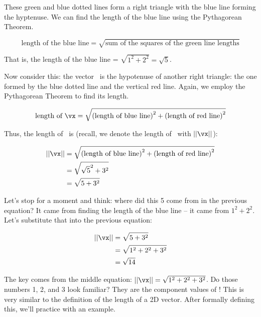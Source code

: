 These green and blue dotted lines form a right triangle with the blue line forming the hyptenuse. We can find the length of the blue line using the Pythagorean Theorem. 

$$\text{length of the blue line} = \sqrt{ \text{sum of the squares of the green line lengths}}$$

That is, the length of the blue line = $\sqrt{1^2 + 2^2} = \sqrt{5}$.

Now consider this: the vector \vx\ is the hypotenuse of another right triangle: the one formed by the blue dotted line and the vertical red line. Again, we employ the Pythagorean Theorem to find its length.

$$\text{length of } \vx = \sqrt{ \text{(length of blue line)}^2 + \text{(length of red line)}^2}$$

Thus, the length of \vx\ is (recall, we denote the length of \vx\ with $||\vx||$):

\begin{align*}
||\vx|| &= \sqrt{\text{(length of blue line)}^2 + \text{(length of red line)}^2} \\
				&= \sqrt{ \sqrt{5}^2 + 3^2}\\
				&= \sqrt{ 5 + 3^2}\\
\end{align*}

Let's stop for a moment and think: where did this 5 come from in the previous equation? It came from finding the length of the blue line -- it came from $1^2+2^2$. Let's substitute that into the previous equation:

\begin{align*}
||\vx||	&= \sqrt{5+ 3^2} \\
				&= \sqrt{1^2+2^2+3^2}\\
				&= \sqrt{14}\\
\end{align*}

The key comes from the middle equation: $||\vx|| = \sqrt{1^2+2^2+3^2}$. Do those numbers 1, 2, and 3 look familiar? They are the component values of \vx! This is very similar to the definition of the length of a 2D vector. After formally defining this, we'll practice with an example.


